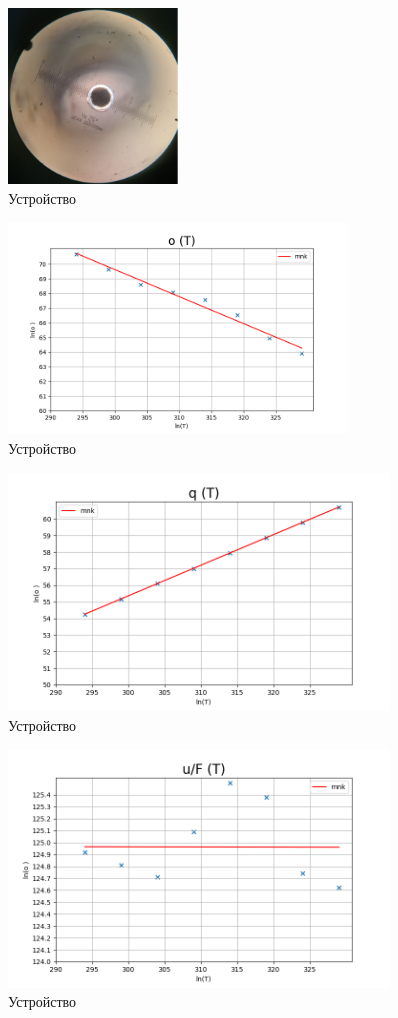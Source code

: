 \documentclass[a4paper]{article}
\begin{document}
\begin{figure}
    \centering
    \includegraphics[width=0.4\textwidth]{igla.PNG}
    \caption{Устройство}
\end{figure}

\begin{figure}
    \centering
    \includegraphics[width=0.8\textwidth]{sigmaT.PNG}
    \caption{Устройство}
\end{figure}


\begin{figure}
    \centering
    \includegraphics[width=0.9\textwidth]{qt.PNG}
    \caption{Устройство}
\end{figure}

\begin{figure}
    \centering
    \includegraphics[width=0.9\textwidth]{uff.PNG}
    \caption{Устройство}
\end{figure}
\end{document}
